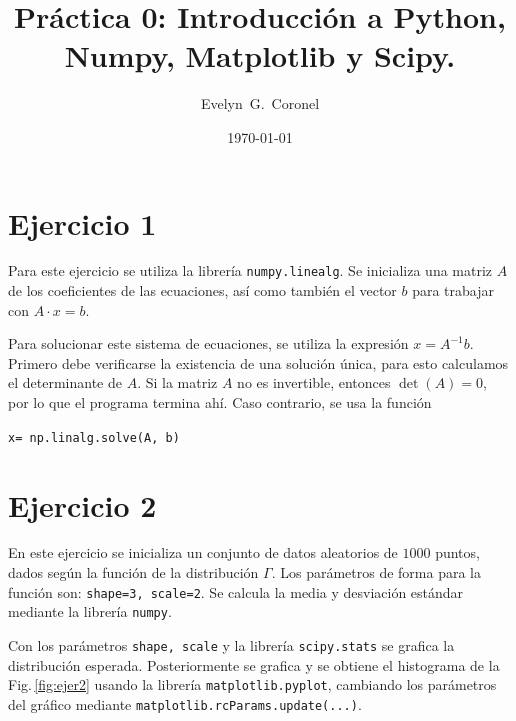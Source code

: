 





\title{Práctica 0: Introducción a Python, Numpy, Matplotlib y Scipy.}
\author{Evelyn~G.~Coronel}


\date[]{\lowercase{\today}} %


\maketitle


\section*{Ejercicio 1}

Para este ejercicio se utiliza la librería \verb|numpy.linealg|. Se inicializa una matriz $A$ de los coeficientes de las ecuaciones, así como también el vector $b$ para trabajar con $A\cdot x = b $.



Para solucionar este sistema de ecuaciones, se utiliza la expresión $x=A^{-1}b$. Primero debe verificarse la existencia de una solución única, para esto calculamos el determinante de $A$. Si la matriz $A$ no es invertible, entonces  $\det(A)=0$, por lo que el programa termina ahí. Caso contrario, se usa la función 

\verb|x= np.linalg.solve(A, b)|

\section*{Ejercicio 2}

En este ejercicio se inicializa un conjunto de datos aleatorios de $1000$ puntos, dados según la función de la distribución $\Gamma$. Los parámetros de forma para la función  son: \verb|shape=3, scale=2|. Se calcula la media y desviación estándar mediante la librería \verb|numpy|.

Con los  parámetros \verb|shape, scale|  y la librería \verb|scipy.stats| se grafica la distribución esperada. Posteriormente se grafica y se obtiene el histograma de la Fig.\,\ref{fig:ejer2} usando la librería \verb|matplotlib.pyplot|, cambiando los parámetros del gráfico mediante \verb|matplotlib.rcParams.update(...)|. 

